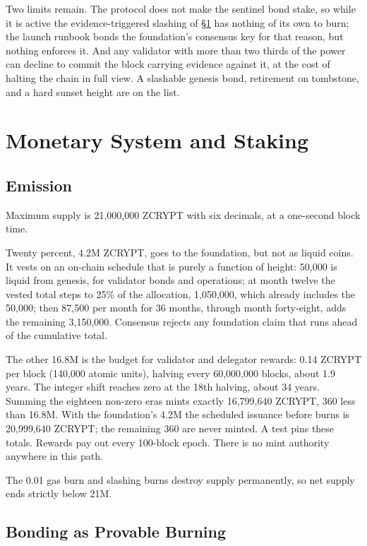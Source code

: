 \documentclass[twocolumn,10pt]{article}
\begin{document}
Two limits remain. The protocol does not make the sentinel bond stake, so while it is active the evidence-triggered slashing of \S\ref{sec:econ} has nothing of its own to burn; the launch runbook bonds the foundation's consensus key for that reason, but nothing enforces it. And any validator with more than two thirds of the power can decline to commit the block carrying evidence against it, at the cost of halting the chain in full view. A slashable genesis bond, retirement on tombstone, and a hard sunset height are on the list.

\section{Monetary System and Staking}
\label{sec:econ}

\subsection{Emission}

Maximum supply is 21{,}000{,}000 ZCRYPT with six decimals, at a one-second block time.

Twenty percent, 4.2M ZCRYPT, goes to the foundation, but not as liquid coins. It vests on an on-chain schedule that is purely a function of height: 50{,}000 is liquid from genesis, for validator bonds and operations; at month twelve the vested total steps to 25\% of the allocation, 1{,}050{,}000, which already includes the 50{,}000; then 87{,}500 per month for 36 months, through month forty-eight, adds the remaining 3{,}150{,}000. Consensus rejects any foundation claim that runs ahead of the cumulative total.

The other 16.8M is the budget for validator and delegator rewards: 0.14 ZCRYPT per block (140{,}000 atomic units), halving every 60{,}000{,}000 blocks, about 1.9 years. The integer shift reaches zero at the 18th halving, about 34 years. Summing the eighteen non-zero eras mints exactly 16{,}799{,}640 ZCRYPT, 360 less than 16.8M. With the foundation's 4.2M the scheduled issuance before burns is 20{,}999{,}640 ZCRYPT; the remaining 360 are never minted. A test pins these totals. Rewards pay out every 100-block epoch. There is no mint authority anywhere in this path.

The 0.01 gas burn and slashing burns destroy supply permanently, so net supply ends strictly below 21M.

\subsection{Bonding as Provable Burning}
\end{document}
